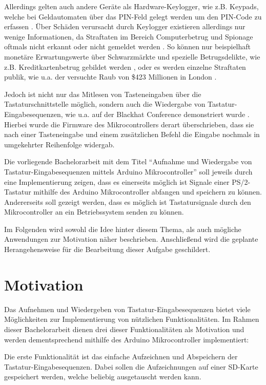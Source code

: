 Allerdings gelten auch andere Geräte als Hardware-Keylogger, wie z.B. Keypads, welche bei Geldautomaten über das PIN-Feld gelegt werden um den PIN-Code zu erfassen \cite{kirk}. Über Schäden verursacht durch Keylogger existieren allerdings nur wenige Informationen, da Straftaten im Bereich Computerbetrug und Spionage oftmals nicht erkannt oder nicht gemeldet werden \cite{bundeskriminalamt}. So können nur beispielhaft monetäre Erwartungswerte über Schwarzmärkte und spezielle Betrugsdelikte, wie z.B. Kreditkartenbetrug gebildet werden \cite{holz}, oder es werden einzelne Straftaten publik, wie u.a. der versuchte Raub von \$423 Millionen in London \cite{keizer}.

Jedoch ist nicht nur das Mitlesen von Tasteneingaben über die Tastaturschnittstelle möglich, sondern auch die Wiedergabe von Tastatur-Eingabesequenzen, wie u.a. auf der Blackhat Conference demonstriert wurde \cite{chen}. Hierbei wurde die Firmware des Mikrocontrollers derart überschrieben, dass sie nach einer Tasteneingabe und einem zusätzlichen Befehl die Eingabe nochmals in umgekehrter Reihenfolge widergab.

Die vorliegende Bachelorarbeit mit dem Titel ``Aufnahme und Wiedergabe von Tastatur-Eingabesequenzen mittels Arduino Mikrocontroller'' soll jeweils durch eine Implementierung zeigen, dass es einerseits möglich ist Signale einer PS/2-Tastatur mithilfe des Arduino Mikrocontroller \cite{arduino} abfangen und speichern zu können. Andererseits soll gezeigt werden, dass es möglich ist Tastatursignale durch den Mikrocontroller an ein Betriebssystem senden zu können.

Im Folgenden wird sowohl die Idee hinter diesem Thema, als auch mögliche Anwendungen zur Motivation näher beschrieben. Anschließend wird die geplante Herangehensweise für die Bearbeitung dieser Aufgabe geschildert.



\section{Motivation}
Das Aufnehmen und Wiedergeben von Tastatur-Eingabesequenzen bietet viele Möglichkeiten zur Implementierung von nützlichen Funktionalitäten. Im Rahmen dieser Bachelorarbeit dienen drei dieser Funktionalitäten als Motivation und werden dementsprechend mithilfe des Arduino Mikrocontroller \cite{arduino} implementiert:

Die erste Funktionalität ist das einfache Aufzeichnen und Abspeichern der Tastatur-Eingabesequenzen. Dabei sollen die Aufzeichnungen auf einer SD-Karte gespeichert werden, welche beliebig ausgetauscht werden kann.

